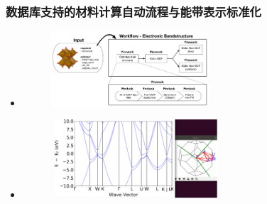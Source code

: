 \documentclass[cjk,slidestop,compress,mathserif,blue]{beamer}
\begin{document}
{\begin{minipage}[b]{0.49\linewidth}
\begin{itemize}
\begin{figure}[h!]
\label{MP_comp_BCC}
\end{figure}
	\end{itemize}
\end{minipage}
}

\frame
{
	\frametitle{数据库支持的材料计算自动流程与能带表示标准化}
	\begin{itemize}
		\item {\fontsize{8.2pt}{4.2pt}}
\begin{figure}[h!]
\centering
\vskip -5pt
\includegraphics[height=1.1in]{Figures/bandstructure_wf.png}
\label{bandstructure_wf}
\end{figure}
		\item {\fontsize{8.0pt}{4.2pt}}
\begin{figure}[h!]
\centering
\vspace*{-0.1in}
\includegraphics[height=1.15in,width=2.5in,viewport=0 0 1150 560,clip]{Figures/FCC_Si-k-path.png}
\label{FCC-Si_bandstruct}
\end{figure} 
	\end{itemize}
}
\end{document}
